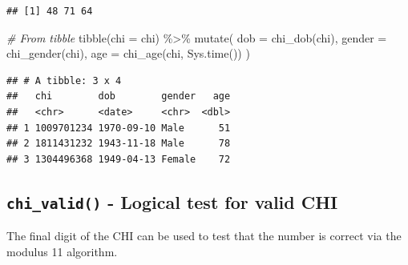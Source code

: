 \documentclass[
]{book}
\newenvironment{Shaded}{\begin{snugshade}}{\end{snugshade}}
\newcommand{\AttributeTok}[1]{\textcolor[rgb]{0.77,0.63,0.00}{#1}}
\newcommand{\CommentTok}[1]{\textcolor[rgb]{0.56,0.35,0.01}{\textit{#1}}}
\newcommand{\FunctionTok}[1]{\textcolor[rgb]{0.00,0.00,0.00}{#1}}
\newcommand{\NormalTok}[1]{#1}
\newcommand{\SpecialCharTok}[1]{\textcolor[rgb]{0.00,0.00,0.00}{#1}}
\begin{document}
\begin{verbatim}
## [1] 48 71 64
\end{verbatim}

\begin{Shaded}
\begin{Highlighting}[]
\CommentTok{\# From tibble}
\FunctionTok{tibble}\NormalTok{(}\AttributeTok{chi =}\NormalTok{ chi) }\SpecialCharTok{\%\textgreater{}\%} 
  \FunctionTok{mutate}\NormalTok{(}
    \AttributeTok{dob =} \FunctionTok{chi\_dob}\NormalTok{(chi),}
    \AttributeTok{gender =} \FunctionTok{chi\_gender}\NormalTok{(chi),}
    \AttributeTok{age =} \FunctionTok{chi\_age}\NormalTok{(chi, }\FunctionTok{Sys.time}\NormalTok{())}
\NormalTok{  )}
\end{Highlighting}
\end{Shaded}

\begin{verbatim}
## # A tibble: 3 x 4
##   chi        dob        gender   age
##   <chr>      <date>     <chr>  <dbl>
## 1 1009701234 1970-09-10 Male      51
## 2 1811431232 1943-11-18 Male      78
## 3 1304496368 1949-04-13 Female    72
\end{verbatim}

\hypertarget{chi_valid---logical-test-for-valid-chi}{%
\subsection{\texorpdfstring{\texttt{chi\_valid()} - Logical test for valid CHI}{chi\_valid() - Logical test for valid CHI}}\label{chi_valid---logical-test-for-valid-chi}}

The final digit of the CHI can be used to test that the number is correct via the modulus 11 algorithm.
\end{document}
